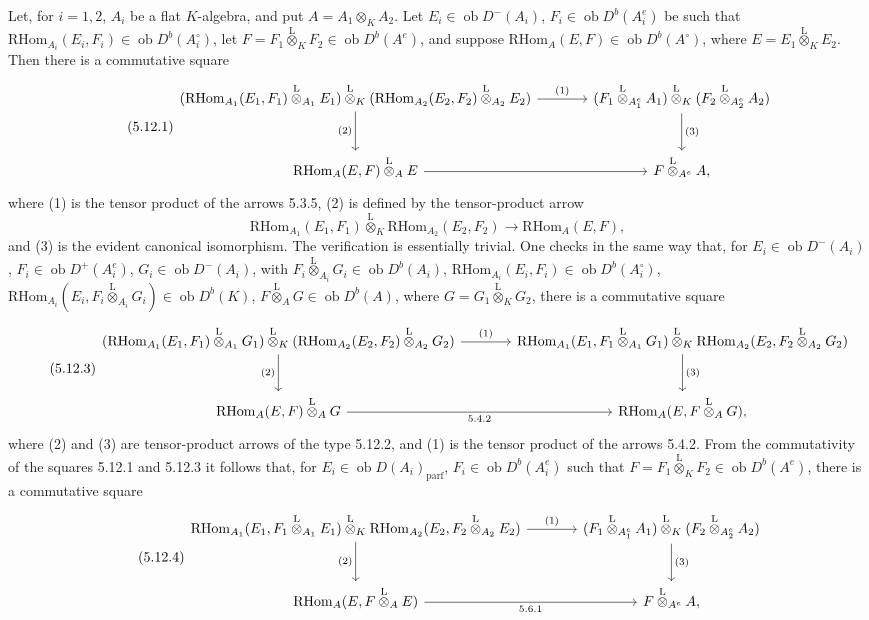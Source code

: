 \documentclass[11pt]{article}
\newcommand{\ob}{\operatorname{ob}}
\providecommand{\RHom}{\mathrm{RHom}}
\providecommand{\lten}{\overset{\mathrm L}{\otimes}}
\providecommand{\RHom}{\mathrm{RHom}}
\providecommand{\ob}{\operatorname{ob}}
\providecommand{\lten}{\overset{\mathrm L}{\otimes}}
\providecommand{\RHom}{\mathrm R\mathcal{H}om}
\providecommand{\lten}{\overset{\mathrm L}{\otimes}}
\providecommand{\lten}{\overset{\mathrm L}{\otimes}}
\providecommand{\lten}{\overset{\mathrm L}{\otimes}}
\providecommand{\lten}{\overset{\mathrm L}{\otimes}}
\providecommand{\RHom}{\mathrm{RHom}}
\begin{document}
Let, for $i=1,2$, $A_i$ be a flat $K$-algebra, and put $A=A_1\otimes_KA_2$. Let $E_i\in\ob D^-(A_i)$, $F_i\in\ob D^b(A_i^e)$ be such that $\RHom_{A_i}(E_i,F_i)\in\ob D^b(A_i^\circ)$, let $F=F_1\lten_KF_2\in\ob D^b(A^e)$, and suppose $\RHom_A(E,F)\in\ob D^b(A^\circ)$, where $E=E_1\lten_KE_2$. Then there is a commutative square
\begin{equation}\tag{5.12.1}
\begin{tikzcd}[column sep=large,row sep=large]
(\RHom_{A_1}(E_1,F_1)\lten_{A_1}E_1)\lten_K(\RHom_{A_2}(E_2,F_2)\lten_{A_2}E_2) \arrow[r,"(1)"] \arrow[d,"(2)"'] & (F_1\lten_{A_1^e}A_1)\lten_K(F_2\lten_{A_2^e}A_2) \arrow[d,"(3)"]\\
\RHom_A(E,F)\lten_AE \arrow[r] & F\lten_{A^e}A,
\end{tikzcd}
\end{equation}
where (1) is the tensor product of the arrows 5.3.5, (2) is defined by the tensor-product arrow
\begin{equation}\tag{5.12.2}
\RHom_{A_1}(E_1,F_1)\lten_K\RHom_{A_2}(E_2,F_2)\longrightarrow\RHom_A(E,F),
\end{equation}
and (3) is the evident canonical isomorphism. The verification is essentially trivial. One checks in the same way that, for $E_i\in\ob D^-(A_i)$, $F_i\in\ob D^+(A_i^e)$, $G_i\in\ob D^-(A_i)$, with $F_i\lten_{A_i}G_i\in\ob D^b(A_i)$, $\RHom_{A_i}(E_i,F_i)\in\ob D^b(A_i^\circ)$, $\RHom_{A_i}(E_i,F_i\lten_{A_i}G_i)\in\ob D^b(K)$, $F\lten_AG\in\ob D^b(A)$, where $G=G_1\lten_KG_2$, there is a commutative square
\begin{equation}\tag{5.12.3}
\begin{tikzcd}[column sep=large,row sep=large]
(\RHom_{A_1}(E_1,F_1)\lten_{A_1}G_1)\lten_K(\RHom_{A_2}(E_2,F_2)\lten_{A_2}G_2) \arrow[r,"(1)"] \arrow[d,"(2)"'] & \RHom_{A_1}(E_1,F_1\lten_{A_1}G_1)\lten_K\RHom_{A_2}(E_2,F_2\lten_{A_2}G_2) \arrow[d,"(3)"]\\
\RHom_A(E,F)\lten_AG \arrow[r,"5.4.2"'] & \RHom_A(E,F\lten_AG),
\end{tikzcd}
\end{equation}
where (2) and (3) are tensor-product arrows of the type 5.12.2, and (1) is the tensor product of the arrows 5.4.2. From the commutativity of the squares 5.12.1 and 5.12.3 it follows that, for $E_i\in\ob D(A_i)_{\mathrm{parf}}$, $F_i\in\ob D^b(A_i^e)$ such that $F=F_1\lten_KF_2\in\ob D^b(A^e)$, there is a commutative square
\begin{equation}\tag{5.12.4}
\begin{tikzcd}[column sep=large,row sep=large]
\RHom_{A_1}(E_1,F_1\lten_{A_1}E_1)\lten_K\RHom_{A_2}(E_2,F_2\lten_{A_2}E_2) \arrow[r,"(1)"] \arrow[d,"(2)"'] & (F_1\lten_{A_1^e}A_1)\lten_K(F_2\lten_{A_2^e}A_2) \arrow[d,"(3)"]\\
\RHom_A(E,F\lten_AE) \arrow[r,"5.6.1"'] & F\lten_{A^e}A,
\end{tikzcd}
\end{equation}
\end{document}
